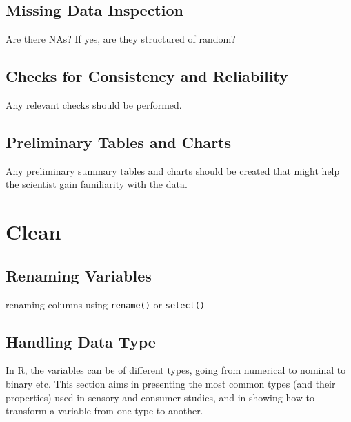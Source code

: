 \documentclass[
]{book}
\begin{document}
\hypertarget{missing-data-inspection}{%
\subsection{Missing Data Inspection}\label{missing-data-inspection}}

Are there NAs?
If yes, are they structured of random?

\hypertarget{checks-for-consistency-and-reliability}{%
\subsection{Checks for Consistency and Reliability}\label{checks-for-consistency-and-reliability}}

Any relevant checks should be performed.

\hypertarget{preliminary-tables-and-charts}{%
\subsection{Preliminary Tables and Charts}\label{preliminary-tables-and-charts}}

Any preliminary summary tables and charts should be created that might help the scientist gain familiarity with the data.

\hypertarget{clean}{%
\section{Clean}\label{clean}}

\hypertarget{renaming-variables-1}{%
\subsection{Renaming Variables}\label{renaming-variables-1}}

renaming columns using \texttt{rename()} or \texttt{select()}

\hypertarget{handling-data-type}{%
\subsection{Handling Data Type}\label{handling-data-type}}

In R, the variables can be of different types, going from numerical to nominal to binary etc. This section aims in presenting the most common types (and their properties) used in sensory and consumer studies, and in showing how to transform a variable from one type to another.
\end{document}
